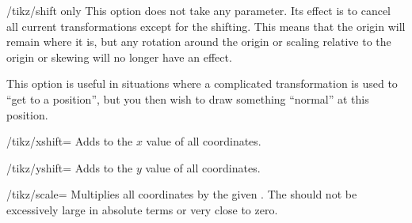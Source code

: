 \begin{key}{/tikz/shift only}
    This option does not take any parameter. Its effect is to cancel all
    current transformations except for the shifting. This means that the origin
    will remain where it is, but any rotation around the origin or scaling
    relative to the origin or skewing will no longer have an effect.

    This option is useful in situations where a complicated transformation is
    used to ``get to a position'', but you then wish to draw something
    ``normal'' at this position.
\begin{codeexample}[]
\end{codeexample}
\end{key}

\begin{key}{/tikz/xshift=}
    Adds  to the $x$ value of all coordinates.
\begin{codeexample}[]
\end{codeexample}
\end{key}

\begin{key}{/tikz/yshift=}
    Adds  to the $y$ value of all coordinates.
\end{key}

\begin{key}{/tikz/scale=}
    Multiplies all coordinates by the given . The 
    should not be excessively large in absolute terms or very close to zero.
\begin{codeexample}[]
\end{codeexample}
\end{key}

